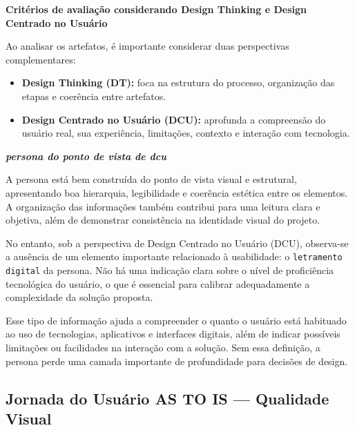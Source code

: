 \documentclass[
  sigconf,
  nonacm, %
  language=portuguese
]{acmart}
\newcommand{\statuswarn}[1]{{\small\bfseries\color{cwarn}#1}}
\begin{document}
\textbf{Critérios de avaliação considerando Design Thinking e Design Centrado no Usuário }

Ao analisar os artefatos, é importante considerar duas perspectivas complementares:

\begin{itemize}[leftmargin=14pt,itemsep=2pt,topsep=4pt]
  \item \textbf{Design Thinking (DT):} foca na estrutura do processo, organização das etapas e coerência entre artefatos.
  \item \textbf{Design Centrado no Usuário (DCU):} aprofunda a compreensão do usuário real, sua experiência, limitações, contexto e interação com tecnologia.
\end{itemize}

\textit{\textbf{persona do ponto de vista de dcu}}

A persona está bem construída do ponto de vista visual e estrutural, apresentando boa hierarquia, legibilidade e coerência estética entre os elementos. A organização das informações também contribui para uma leitura clara e objetiva, além de demonstrar consistência na identidade visual do projeto.

No entanto, sob a perspectiva de Design Centrado no Usuário (DCU), observa-se a ausência de um elemento importante relacionado à usabilidade: o \texttt{letramento digital} da persona. Não há uma indicação clara sobre o nível de proficiência tecnológica do usuário, o que é essencial para calibrar adequadamente a complexidade da solução proposta.

Esse tipo de informação ajuda a compreender o quanto o usuário está habituado ao uso de tecnologias, aplicativos e interfaces digitais, além de indicar possíveis limitações ou facilidades na interação com a solução. Sem essa definição, a persona perde uma camada importante de profundidade para decisões de design.

\subsection{Jornada do Usuário AS TO IS — Qualidade Visual}

\noindent\statuswarn{0,98\,/\,1,50 pts · Faltou pouco}
\end{document}

